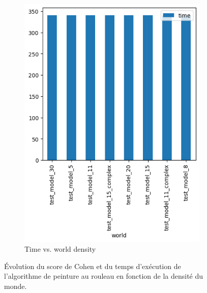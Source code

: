 \documentclass[francais,RandD]{rapportPFE}
\begin{document}
\begin{figure}[h!]
\begin{subfigure}[t]{0.49\linewidth}
					\includegraphics[width=\linewidth]{graphics/peinture_au_rouleau-time_vs_world.png}
					\caption{Time vs. world density}
					\label{fig:peinture_au_rouleau-time_vs_world}
			\end{subfigure}
			\caption{Évolution du score de Cohen et du temps d'exécution de l'algorithme de peinture au rouleau en fonction de la densité du monde.}
			\label{fig:peinture_au_rouleau-world}
		\end{figure}
\end{document}
